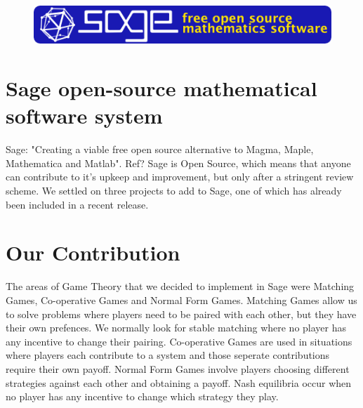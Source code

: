 \documentclass[a0,landscape]{a0poster}
\begin{document}
\vspace{1cm}
\begin{multicols}{3}


\begin{figure}[H]
\centering
\includegraphics[width=0.9\linewidth]{Images/sage-banner-02.png}
\end{figure}

\color{Brown}
\section*{Sage open-source mathematical software system}
Sage: "Creating a viable free open source alternative to Magma, Maple, Mathematica and Matlab".
Ref?
Sage is Open Source, which means that anyone can contribute to it's upkeep and improvement, but only after a stringent review scheme.
We settled on three projects to add to Sage, one of which has already been included in a recent release.

\section*{Our Contribution}
The areas of Game Theory that we decided to implement in Sage were Matching Games, Co-operative Games and Normal Form Games.
Matching Games allow us to solve problems where players need to be paired with each other, but they have their own prefences.
We normally look for stable matching where no player has any incentive to change their pairing.
Co-operative Games are used in situations where players each contribute to a system and those seperate contributions require their own payoff.
Normal Form Games involve players choosing different strategies against each other and obtaining a payoff.
Nash equilibria occur when no player has any incentive to change which strategy they play.


\end{multicols}
\end{document}
